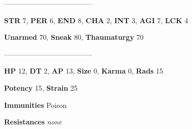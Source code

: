 \documentclass[11pt,a4paper,twocolumn]{book}
\begin{document}
%	
%
%

	--------------------------------------
	
	\noindent
	\textbf{STR} 7, \textbf{PER} 6, \textbf{END} 8, \textbf{CHA} 2, \textbf{INT} 3, \textbf{AGI} 7, \textbf{LCK} 4
	
	\noindent
	\textbf{Unarmed} 70, \textbf{Sneak} 80, \textbf{Thaumaturgy} 70
	
	--------------------------------------
	
	\noindent
	\textbf{HP} 12, \textbf{DT} 2, \textbf{AP} 13, \textbf{Size} 0, \textbf{Karma} 0, \textbf{Rads} 15
	
	\noindent
	\textbf{Potency} 15, \textbf{Strain} 25
	
	\noindent
	\textbf{Immunities} Poison
	
	\noindent
	\textbf{Resistances} \emph{none}
	
\end{document}
